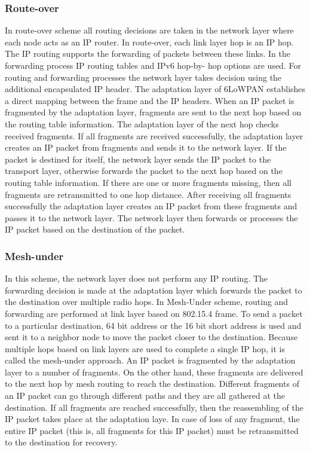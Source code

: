 \documentclass[11pt,draftclsnofoot,onecolumn]{IEEEtran}
\begin{document}
\subsubsection{Route-over}
In route-over scheme all routing decisions are taken in the network layer where each node acts as an IP router. In route-over, each link layer hop is an IP hop. The IP routing supports the forwarding of packets between these links. In the forwarding process IP routing tables and IPv6 hop-by- hop options are used. For routing and forwarding processes the network layer takes decision using the additional encapsulated IP header. The adaptation layer of 6LoWPAN establishes a direct mapping between the frame and the IP headers. When an IP packet is fragmented by the adaptation layer, fragments are sent to the next hop based on the routing table information. The adaptation layer of the next hop checks received fragments. If all fragments are received successfully, the adaptation layer creates an IP packet from fragments and sends it to the network layer. If the packet is destined for itself, the network layer sends the IP packet to the transport layer, otherwise forwards the packet to the next hop based on the routing table information. If there are one or more fragments missing, then all fragments are retransmitted to one hop distance. After receiving all fragments successfully the adaptation layer creates an IP packet from these fragments and passes it to the network layer. The network layer then forwards or processes the IP packet based on the destination of the packet.

\subsubsection{Mesh-under}
In this scheme, the network layer does not perform any IP routing. The forwarding decision is made at the adaptation layer which forwards the packet to the destination over multiple radio hops. In Mesh-Under scheme, routing and forwarding are performed at link layer based on 802.15.4 frame. To send a packet to a particular destination, 64 bit address or the 16 bit short address is used and sent it to a neighbor node to move the packet closer to the destination. Because multiple hops based on link layers are used to complete a single IP hop, it is called the mesh-under approach. An IP packet is fragmented by the adaptation layer to a number of fragments. On the other hand, these fragments are delivered to the next hop by mesh routing to reach the destination. Different fragments of an IP packet can go through different paths and they are all gathered at the destination. If all fragments are reached successfully, then the reassembling of the IP packet takes place at the adaptation laye. In case of loss of any fragment, the entire IP packet (this is, all fragments for this IP packet) must be retransmitted to the destination for recovery.
\end{document}
